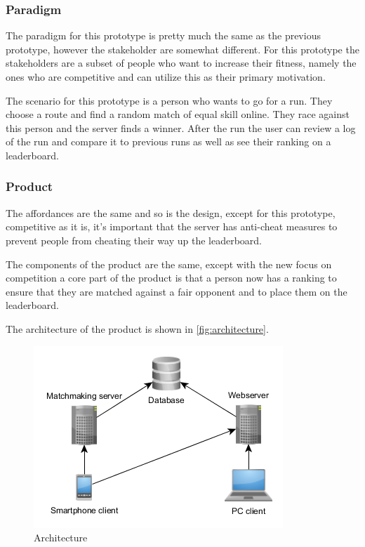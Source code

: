 \subsubsection{Paradigm}
The paradigm for this prototype is pretty much the same as the previous prototype, however the stakeholder are somewhat different. For this prototype the stakeholders are a subset of people who want to increase their fitness, namely the ones who are competitive and can utilize this as their primary motivation. 

The scenario for this prototype is a person who wants to go for a run. They choose a route and find a random match of equal skill online. They race against this person and the server finds a winner. After the run the user can review a log of the run and compare it to previous runs as well as see their ranking on a leaderboard. 

\subsubsection{Product}
The affordances are the same and so is the design, except for this prototype, competitive as it is, it's important that the server has anti-cheat measures to prevent people from cheating their way up the leaderboard.

The components of the product are the same, except with the new focus on competition a core part of the product is that a person now has a ranking to ensure that they are matched against a fair opponent and to place them on the leaderboard.

The architecture of the product is shown in \autoref{fig:architecture}.

\begin{figure}[!ht]
	\begin{center}
		\includegraphics[scale=0.75]{img/architecture.png}
		\caption{Architecture}
		\label{fig:architecture}
	\end{center}
\end{figure}


